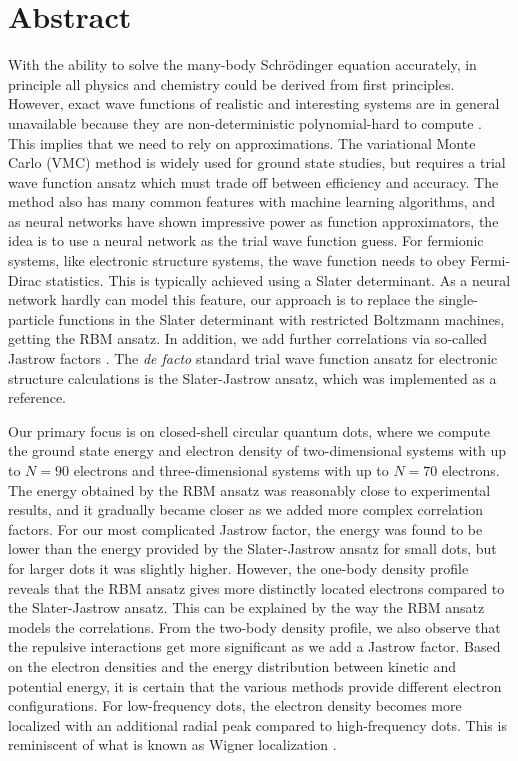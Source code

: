 \newpage
\section*{Abstract}
With the ability to solve the many-body Schrödinger equation accurately, in principle all physics and chemistry could be derived from first principles. However, exact wave functions of realistic and interesting systems are in general unavailable because they are non-deterministic polynomial-hard to compute \supercite{troyer_computational_2005}. This implies that we need to rely on approximations. The variational Monte Carlo (VMC) method is widely used for ground state studies, but requires a trial wave function ansatz which must trade off between efficiency and accuracy. The method also has many common features with machine learning algorithms, and as neural networks have shown impressive power as function approximators, the idea is to use a neural network as the trial wave function guess. For fermionic systems, like electronic structure systems, the wave function needs to obey Fermi-Dirac statistics. This is typically achieved using a Slater determinant. As a neural network hardly can model this feature, our approach is to replace the single-particle functions in the Slater determinant with restricted Boltzmann machines, getting the RBM ansatz. In addition, we add further correlations via so-called Jastrow factors \supercite{drummond_jastrow_2004}. The \textit{de facto} standard trial wave function ansatz for electronic structure calculations is the Slater-Jastrow ansatz, which was implemented as a reference.

Our primary focus is on closed-shell circular quantum dots, where we compute the ground state energy and electron density of two-dimensional systems with up to $N=90$ electrons and three-dimensional systems with up to $N=70$ electrons. The energy obtained by the RBM ansatz was reasonably close to experimental results, and it gradually became closer as we added more complex correlation factors. For our most complicated Jastrow factor, the energy was found to be lower than the energy provided by the Slater-Jastrow ansatz for small dots, but for larger dots it was slightly higher. However, the one-body density profile reveals that the RBM ansatz gives more distinctly located electrons compared to the Slater-Jastrow ansatz. This can be explained by the way the RBM ansatz models the correlations. From the two-body density profile, we also observe that the repulsive interactions get more significant as we add a Jastrow factor. Based on the electron densities and the energy distribution between kinetic and potential energy, it is certain that the various methods provide different electron configurations. For low-frequency dots, the electron density becomes more localized with an additional radial peak compared to high-frequency dots. This is reminiscent of what is known as Wigner localization \supercite{ghosal_incipient_2007}.

